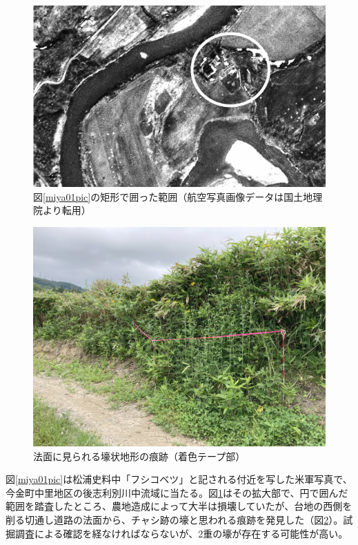 \documentclass[a4j,11pt,twocolumn,openany]{jsbook}
\begin{document}
\begin{figure}[ht]
	\centering
	\includegraphics[width=\linewidth]{fig/05_Miyamoto/pic02.pdf}
	\caption{図\ref{miya01pic}の矩形で囲った範囲（航空写真画像データは国土地理院より転用）}
	\label{miya02pic}
	\vspace{-\baselineskip}
\end{figure}

\begin{figure}[ht]
	\centering
	\includegraphics[width=\linewidth]{fig/05_Miyamoto/pic03.jpg}
	\caption{法面に見られる壕状地形の痕跡（着色テープ部）}
	\label{miya03pic}
	\vspace{-\baselineskip}
\end{figure}

図\ref{miya01pic}は松浦史料中「フシコベツ」と記される付近を写した米軍写真で、今金町中里地区の後志利別川中流域に当たる。図\ref{miya02pic}はその拡大部で、円で囲んだ範囲を踏査したところ、農地造成によって大半は損壊していたが、台地の西側を削る切通し道路の法面から、チャシ跡の壕と思われる痕跡を発見した（図\ref{miya03pic}）。試掘調査による確認を経なければならないが、2重の壕が存在する可能性が高い。
\end{document}
